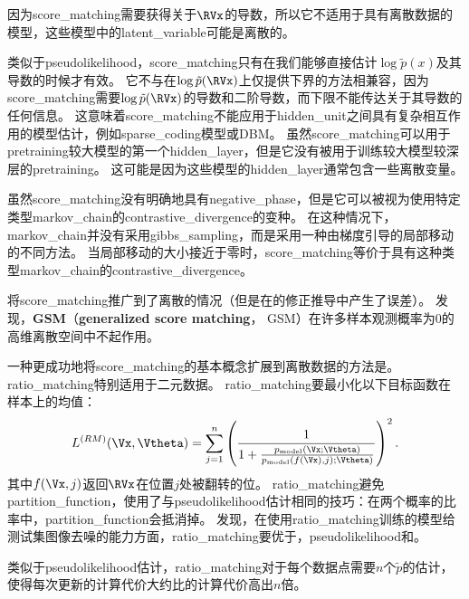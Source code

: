 
因为\gls{score_matching}需要获得关于$\RVx$的导数，所以它不适用于具有离散数据的模型，这些模型中的\gls{latent_variable}可能是离散的。


类似于\gls{pseudolikelihood}，\gls{score_matching}只有在我们能够直接估计$\log \tilde{p}(x)$及其导数的时候才有效。
它不与在$\log \tilde{p}(\RVx)$上仅提供下界的方法相兼容，因为\gls{score_matching}需要$\log \tilde{p}(\RVx)$的导数和二阶导数，而下限不能传达关于其导数的任何信息。
这意味着\gls{score_matching}不能应用于\gls{hidden_unit}之间具有复杂相互作用的模型估计，例如\gls{sparse_coding}模型或\gls{DBM}。
虽然\gls{score_matching}可以用于\gls{pretraining}较大模型的第一个\gls{hidden_layer}，但是它没有被用于训练较大模型较深层的\gls{pretraining}。
这可能是因为这些模型的\gls{hidden_layer}通常包含一些离散变量。


虽然\gls{score_matching}没有明确地具有\gls{negative_phase}，但是它可以被视为使用特定类型\gls{markov_chain}的\gls{contrastive_divergence}的变种\citep{Hyvarinen-2007b}。
在这种情况下，\gls{markov_chain}并没有采用\gls{gibbs_sampling}，而是采用一种由梯度引导的局部移动的不同方法。
当局部移动的大小接近于零时，\gls{score_matching}等价于具有这种类型\gls{markov_chain}的\gls{contrastive_divergence}。


\cite{Lyu09}将\gls{score_matching}推广到了离散的情况（但是在\cite{Marlin10Inductive-small}的修正推导中产生了误差）。
\cite{Marlin10Inductive-small}发现，\textbf{\gls{GSM}}（\textbf{generalized score matching}， GSM）在许多样本观测概率为$0$的高维离散空间中不起作用。


一种更成功地将\gls{score_matching}的基本概念扩展到离散数据的方法是\citep{Hyvarinen-2007}。
\gls{ratio_matching}特别适用于二元数据。
\gls{ratio_matching}要最小化以下目标函数在样本上的均值：
\begin{equation}
	L^{(RM)} (\Vx, \Vtheta) = \sum_{j=1}^n \left( 
	\frac{1}{ 1 + \frac{ p_{\text{model}}(\Vx; \Vtheta) }{ p_{\text{model}}(f(\Vx), j); \Vtheta) } } 
\right)^2.
\end{equation}
其中$f(\Vx, j)$返回$\RVx$在位置$j$处被翻转的位。
\gls{ratio_matching}避免\gls{partition_function}，使用了与\gls{pseudolikelihood}估计相同的技巧：在两个概率的比率中，\gls{partition_function}会抵消掉。
\cite{Marlin10Inductive-small}发现，在使用\gls{ratio_matching}训练的模型给测试集图像去噪的能力方面，\gls{ratio_matching}要优于，\gls{pseudolikelihood}和。


类似于\gls{pseudolikelihood}估计，\gls{ratio_matching}对于每个数据点需要$n$个$\tilde{p}$的估计，使得每次更新的计算代价大约比的计算代价高出$n$倍。


